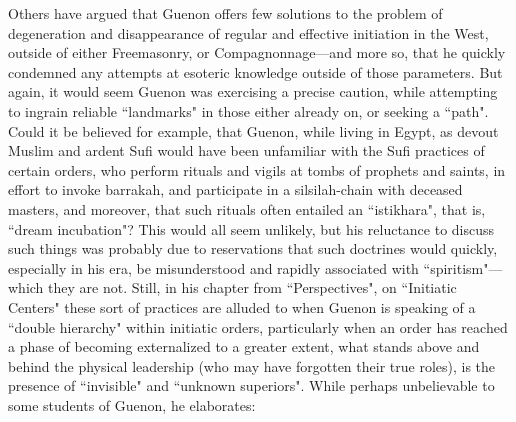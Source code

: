 Others have argued that Guenon offers few solutions to the problem of degeneration and disappearance of regular and effective initiation in the West, outside of either Freemasonry, or Compagnonnage—and more so, that he quickly condemned any attempts at esoteric knowledge outside of those parameters. But again, it would seem Guenon was exercising a precise caution, while attempting to ingrain reliable ``landmarks" in those either already on, or seeking a ``path". Could it be believed for example, that Guenon, while living in Egypt, as devout Muslim and ardent Sufi would have been unfamiliar with the Sufi practices of certain orders, who perform rituals and vigils at tombs of prophets and saints, in effort to invoke barrakah, and participate in a silsilah-chain with deceased masters, and moreover, that such rituals often entailed an ``istikhara", that is, ``dream incubation"? This would all seem unlikely, but his reluctance to discuss such things was probably due to reservations that such doctrines would quickly, especially in his era, be misunderstood and rapidly associated with ``spiritism"—which they are not. Still, in his chapter from ``Perspectives", on ``Initiatic Centers" these sort of practices are alluded to when Guenon is speaking of a ``double hierarchy" within initiatic orders, particularly when an order has reached a phase of becoming externalized to a greater extent, what stands above and behind the physical leadership (who may have forgotten their true roles), is the presence of ``invisible" and ``unknown superiors". While perhaps unbelievable to some students of Guenon, he elaborates:

